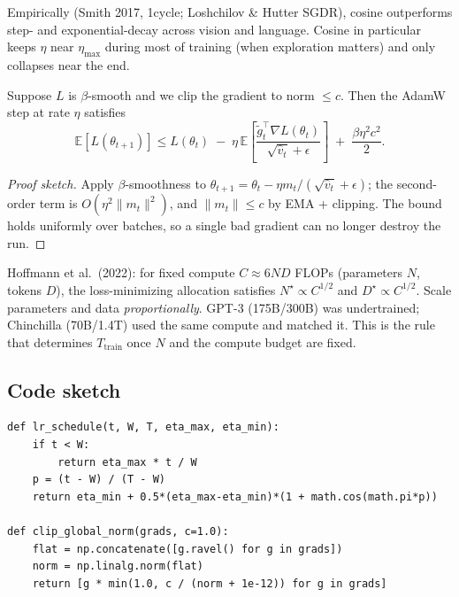 \begin{remark}
Empirically (Smith 2017, 1cycle; Loshchilov \& Hutter SGDR), cosine outperforms step- and exponential-decay across vision and language. Cosine in particular keeps $\eta$ near $\eta_{\max}$ during most of training (when exploration matters) and only collapses near the end.
\end{remark}

\begin{theorem}
Suppose $L$ is $\beta$-smooth and we clip the gradient to norm $\le c$. Then the AdamW step at rate $\eta$ satisfies
\[
\mathbb{E}[L(\theta_{t+1})] \le L(\theta_t) \;-\; \eta\,\mathbb{E}\!\left[\frac{\widetilde g_t^{\top}\nabla L(\theta_t)}{\sqrt{\hat v_t}+\epsilon}\right] \;+\; \frac{\beta\eta^2 c^2}{2}.
\]
\end{theorem}

\begin{proof}[Proof sketch]
Apply $\beta$-smoothness to $\theta_{t+1}=\theta_t-\eta m_t/(\sqrt{\hat v_t}+\epsilon)$; the second-order term is $O(\eta^2\|m_t\|^2)$, and $\|m_t\|\le c$ by EMA + clipping. The bound holds uniformly over batches, so a single bad gradient can no longer destroy the run.
\end{proof}

\begin{remark}
Hoffmann et al.\ (2022): for fixed compute $C\approx 6ND$ FLOPs (parameters $N$, tokens $D$), the loss-minimizing allocation satisfies $N^\star\propto C^{1/2}$ and $D^\star\propto C^{1/2}$. Scale parameters and data \emph{proportionally}. GPT-3 (175B/300B) was undertrained; Chinchilla (70B/1.4T) used the same compute and matched it. This is the rule that determines $T_{\text{train}}$ once $N$ and the compute budget are fixed.
\end{remark}

\subsection*{Code sketch}

\begin{verbatim}
def lr_schedule(t, W, T, eta_max, eta_min):
    if t < W:
        return eta_max * t / W
    p = (t - W) / (T - W)
    return eta_min + 0.5*(eta_max-eta_min)*(1 + math.cos(math.pi*p))

def clip_global_norm(grads, c=1.0):
    flat = np.concatenate([g.ravel() for g in grads])
    norm = np.linalg.norm(flat)
    return [g * min(1.0, c / (norm + 1e-12)) for g in grads]
\end{verbatim}

